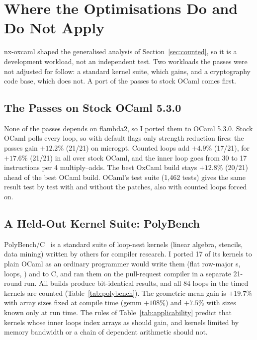 \section{Where the Optimisations Do and Do Not Apply}
\label{sec:generality}

nx-oxcaml shaped the generalised analysis of Section~\ref{sec:counted}, so it
is a development workload, not an independent test. Two workloads the passes
were not adjusted for follow: a standard kernel suite, which gains, and a
cryptography code base, which does not. A port of the passes to stock OCaml
comes first.

\subsection{The Passes on Stock OCaml 5.3.0}
\label{sec:stock}
None of the passes depends on flambda2, so I ported them to OCaml 5.3.0.
Stock OCaml polls every loop, so with default flags only strength reduction
fires: the passes gain $+12.2\%$ (21/21) on microgpt. Counted
loops add $+4.9\%$ (17/21), for
$+17.6\%$ (21/21) in all over stock OCaml, and the
inner loop goes from 30 to 17 instructions per 4 multiply--adds. The best OxCaml build stays $+12.8\%$ (20/21)
ahead of the best OCaml build. OCaml's test suite (1,462 tests) gives the same
result test by test with and without the patches, also with counted loops
forced on.

\subsection{A Held-Out Kernel Suite: PolyBench}
\label{sec:polybench}
PolyBench/C~\cite{polybench} is a standard suite of loop-nest kernels
(linear algebra, stencils, data mining) written by others for compiler
research. I ported 17 of its kernels to plain OCaml as an ordinary programmer
would write them (flat row-major s,  loops,
) and to C, and ran them on the pull-request compiler in a
separate 21-round run. All builds produce bit-identical results, and all
84 loops in the timed kernels are counted (Table~\ref{tab:polybench}). The
geometric-mean gain is $+19.7\%$ with array sizes fixed at compile time
(gemm $+108\%$) and $+7.5\%$ with sizes known only at run time. The
rules of Table~\ref{tab:applicability} predict that kernels whose inner loops
index arrays as  should gain, and kernels limited by
memory bandwidth or a chain of dependent arithmetic should not.

